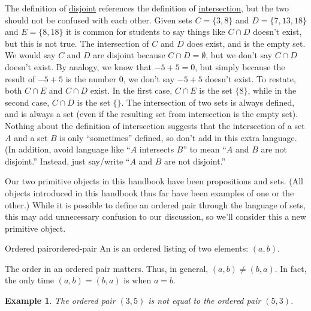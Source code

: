 \documentclass{book}
\newcounter{ekcounter}%
\theoremstyle{ekimcustom}
\newtheorem{example}[ekcounter]{Example}
\newcommand\defn[1]{{\color{blue}{\bf #1}}}
\begin{document}
\begin{bwarning}{}{}
The definition of \underline{disjoint} references the definition of \underline{intersection}, but the two should not be confused with each other. Given sets $C = \{3,8\}$ and $D = \{7,13,18\}$ and $E = \{8,18\}$ it is common for students to say things like $C \cap D$ doesn't exist, but this is not true. The intersection of $C$ and $D$ does exist, and is the empty set. We would say $C$ and $D$ are disjoint because $C \cap D = \emptyset$, but we don't say $C \cap D$ doesn't exist. By analogy, we know that $-5 +5 =0$, but simply because the result of $-5 +5$ is the number $0$, we don't say $-5+5$ doesn't exist.
\vskip6pt
To restate, both $C \cap E$ and $C \cap D$ exist. In the first case, $C \cap E$ is the set $\{8\}$, while in the second case, $C \cap D$ is the set $\{\}$.
\vskip6pt
The intersection of two sets is always defined, and is always a set (even if the resulting set from intersection is the empty set). Nothing about the definition of intersection suggests that the intersection of a set $A$ and a set $B$ is only ``sometimes'' defined, so don't add in this extra language. (In addition, avoid language like ``$A$ intersects $B$'' to mean ``$A$ and $B$ are not disjoint.'' Instead, just say/write ``$A$ and $B$ are not disjoint.''
\end{bwarning}

Our two primitive objects in this handbook have been propositions and sets. (All objects introduced in this handbook thus far have been examples of one or the other.) While it is possible to define an ordered pair through the language of sets, this may add unnecessary confusion to our discussion, so we'll consider this a new primitive object.
\begin{bdefinition}{Ordered pair}{ordered-pair}
An \defn{ordered pair} is an ordered listing of two elements: $(a,b)$.
\end{bdefinition}
The order in an ordered pair matters. Thus, in general, $(a,b) \not= (b,a)$. In fact, the only time $(a,b)=(b,a)$ is when $a=b$.
\begin{example}
The ordered pair $(3,5)$ is not equal to the ordered pair $(5,3)$.
\end{example}
\end{document}
